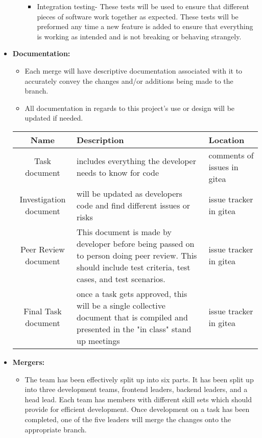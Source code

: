 \documentclass[letterpaper,12pt,oneside,listof=totoc]{scrreprt}
\begin{document}
\begin{itemize}
\begin{itemize}
\begin{itemize}
            \item Integration testing- These tests will be used to ensure that different pieces of software work together as expected. These tests will be preformed any time a new feature is added to ensure that everything is working as intended and is not breaking or behaving strangely. 
        \end{itemize}
    \end{itemize}
    \item \textbf{Documentation:}
    \begin{itemize}
        \item Each merge will have descriptive documentation associated with it to accurately convey the changes and/or additions being made to the branch. 
        \item All documentation in regards to this project's use or design will be updated if needed. 
        
    \end{itemize}
    
    \begin{tabular}{| c | p{} | p{} |}
    \hline
    Name     & Description   & Location \\
    \hline
    Task document & includes everything the developer needs to know for code & comments of issues in gitea \\
    \hline
    Investigation document & will be updated as developers code and find different issues or risks & issue tracker in gitea \\
    \hline
    Peer Review document & This document is made by developer before being passed on to person doing peer review. This should include test criteria, test cases, and test scenarios.  & issue tracker in gitea\\
    \hline
    Final Task document & once a task gets approved, this will be a single collective document that is compiled and presented in the "in class" stand up meetings & issue tracker in gitea\\
    \hline
    \end{tabular}
    \item \textbf{Mergers:}
    \begin{itemize}
        \item The team has been effectively split up into six parts. It has been split up into three development teams, frontend leaders, backend leaders, and a head lead. Each team has members with different skill sets which should provide for efficient development. Once development on a task has been completed, one of the five leaders will merge the changes onto the appropriate branch. 
    \end{itemize}
\end{itemize}
\end{document}
